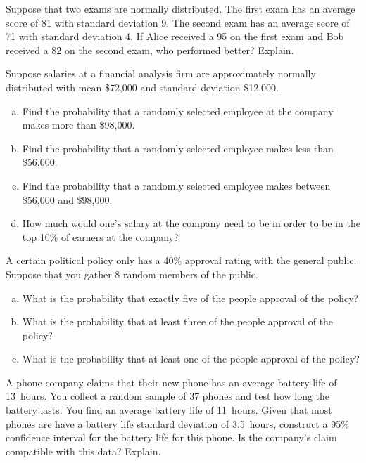 \documentclass[11pt,letterpaper]{article}
\begin{document}

 Suppose that two exams are normally distributed. The first exam has an average score of 81 with standard deviation 9. The second exam has an average score of 71 with standard deviation 4. If Alice received a 95 on the first exam and Bob received a 82 on the second exam, who performed better? Explain. \pspace





\newpage





 Suppose salaries at a financial analysis firm are approximately normally distributed with mean \$72,000 and standard deviation \$12,000. 
        \begin{enumerate}[(a)]
        \item Find the probability that a randomly selected employee at the company makes more than \$98,000.
        \item Find the probability that a randomly selected employee makes less than \$56,000.
        \item Find the probability that a randomly selected employee makes between \$56,000 and \$98,000.
        \item How much would one's salary at the company need to be in order to be in the top 10\% of earners at the company?
        \end{enumerate} \pspace





\newpage





 A certain political policy only has a 40\% approval rating with the general public. Suppose that you gather 8 random members of the public. 
	\begin{enumerate}[(a)]
	\item What is the probability that exactly five of the people approval of the policy?
	\item What is the probability that at least three of the people approval of the policy?
	\item What is the probability that at least one of the people approval of the policy? 
	\end{enumerate} \pspace





\newpage





 A phone company claims that their new phone has an average battery life of 13~hours. You collect a random sample of 37 phones and test how long the battery lasts. You find an average battery life of 11~hours. Given that most phones are have a battery life standard deviation of 3.5~hours, construct a 95\% confidence interval for the battery life for this phone. Is the company's claim compatible with this data? Explain. \pspace
\end{document}
